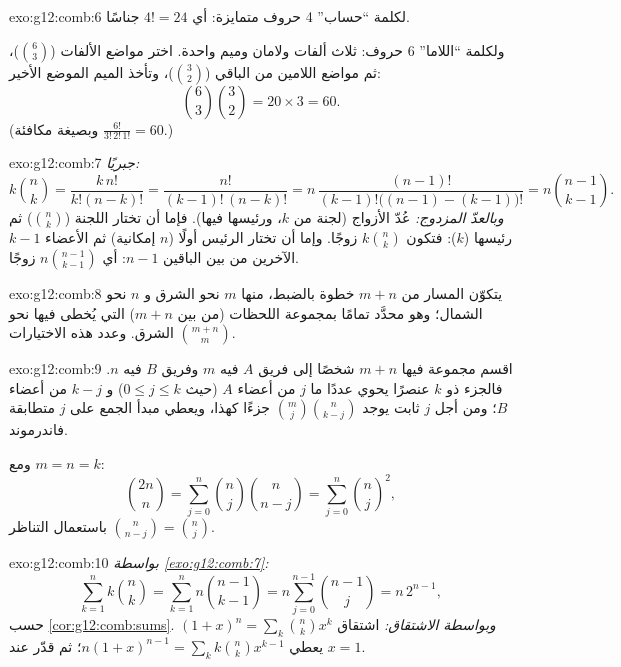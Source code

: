 \begin{solution}{exo:g12:comb:6}
لكلمة ``حساب'' 4 حروف متمايزة: أي $4! = 24$ جناسًا.

ولكلمة ``اللاما'' 6 حروف: ثلاث ألفات ولامان وميم واحدة. اختر مواضع
الألفات ($\binom63$)، ثم مواضع اللامين من الباقي ($\binom32$)، وتأخذ الميم
الموضع الأخير:
\[
\binom{6}{3}\binom{3}{2} = 20 \times 3 = 60 .
\]
(وبصيغة مكافئة $\frac{6!}{3!\,2!\,1!} = 60$.)
\end{solution}

\begin{solution}{exo:g12:comb:7}
\emph{جبريًا:}
\[
k\binom nk = \frac{k\,n!}{k!(n-k)!} = \frac{n!}{(k-1)!\,(n-k)!}
= n\,\frac{(n-1)!}{(k-1)!\bigl((n-1)-(k-1)\bigr)!} = n\binom{n-1}{k-1}.
\]
\emph{وبالعدّ المزدوج:} عُدّ الأزواج (لجنة من $k$، ورئيسها فيها).
فإما أن تختار اللجنة ($\binom nk$) ثم رئيسها ($k$):
فتكون $k\binom nk$ زوجًا. وإما أن تختار الرئيس أولًا ($n$ إمكانية) ثم
الأعضاء $k-1$ الآخرين من بين الباقين $n-1$: أي $n\binom{n-1}{k-1}$ زوجًا.
\end{solution}

\begin{solution}{exo:g12:comb:8}
يتكوّن المسار من $m + n$ خطوة بالضبط، منها $m$ نحو الشرق و $n$
نحو الشمال؛ وهو محدَّد تمامًا بمجموعة اللحظات (من بين $m+n$) التي
يُخطى فيها نحو الشرق. وعدد هذه الاختيارات $\binom{m+n}{m}$.
\end{solution}

\begin{solution}{exo:g12:comb:9}
اقسم مجموعة فيها $m + n$ شخصًا إلى فريق $A$ فيه $m$ وفريق $B$ فيه
$n$. فالجزء ذو $k$ عنصرًا يحوي عددًا ما $j$ من أعضاء $A$
(حيث $0 \leq j \leq k$) و $k - j$ من أعضاء $B$؛ ومن أجل $j$ ثابت يوجد
$\binom mj \binom{n}{k-j}$ جزءًا كهذا، ويعطي مبدأ الجمع على $j$
متطابقة فاندرموند.

ومع $m = n = k$:
\[
\binom{2n}{n} = \sum_{j=0}^n \binom nj \binom{n}{n-j}
= \sum_{j=0}^n \binom nj^{2},
\]
باستعمال التناظر $\binom{n}{n-j} = \binom nj$.
\end{solution}

\begin{solution}{exo:g12:comb:10}
\emph{بواسطة \cref{exo:g12:comb:7}:}
\[
\sum_{k=1}^n k\binom nk = \sum_{k=1}^n n\binom{n-1}{k-1}
= n\sum_{j=0}^{n-1}\binom{n-1}{j} = n\,2^{n-1},
\]
حسب \cref{cor:g12:comb:sums}. \emph{وبواسطة الاشتقاق:} اشتقاق
$(1+x)^n = \sum_k \binom nk x^k$ يعطي
$n(1+x)^{n-1} = \sum_k k \binom nk x^{k-1}$؛ ثم قدّر عند $x = 1$.
\end{solution}

